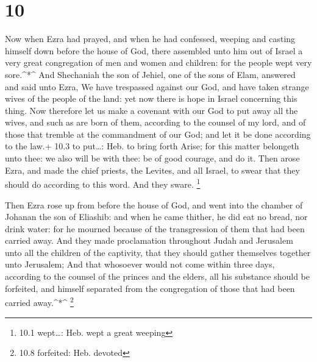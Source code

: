 \hypertarget{section-9}{%
\section{10}\label{section-9}}

 Now when Ezra had prayed, and when he had confessed,
weeping and casting himself down before the house of God, there
assembled unto him out of Israel a very great congregation of men and
women and children: for the people wept very sore.\^{}*\^{} 
And Shechaniah the son of Jehiel, one of the sons of Elam, answered and
said unto Ezra, We have trespassed against our God, and have taken
strange wives of the people of the land: yet now there is hope in Israel
concerning this thing.  Now therefore let us make a covenant
with our God to put away all the wives, and such as are born of them,
according to the counsel of my lord, and of those that tremble at the
commandment of our God; and let it be done according to the law.+ 10.3
to put\ldots: Heb. to bring forth  Arise; for this matter
belongeth unto thee: we also will be with thee: be of good courage, and
do it.  Then arose Ezra, and made the chief priests, the
Levites, and all Israel, to swear that they should do according to this
word. And they sware. \footnote{10.1 wept\ldots: Heb. wept a great
  weeping}

 Then Ezra rose up from before the house of God, and went
into the chamber of Johanan the son of Eliashib: and when he came
thither, he did eat no bread, nor drink water: for he mourned because of
the transgression of them that had been carried away.  And
they made proclamation throughout Judah and Jerusalem unto all the
children of the captivity, that they should gather themselves together
unto Jerusalem;  And that whosoever would not come within
three days, according to the counsel of the princes and the elders, all
his substance should be forfeited, and himself separated from the
congregation of those that had been carried away.\^{}*\^{} \footnote{10.8
  forfeited: Heb. devoted}

